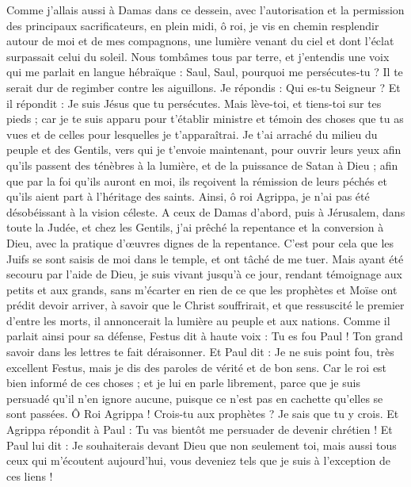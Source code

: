 \begin{multicols}{2}
Comme j'allais aussi à Damas dans ce dessein, avec l’autorisation et la permission des principaux sacrificateurs,
en plein midi, ô roi, je vis en chemin resplendir autour de moi et de mes compagnons, une lumière venant du ciel et dont l’éclat surpassait celui du soleil.
Nous tombâmes tous par terre, et j’entendis une voix qui me parlait en langue hébraïque : Saul, Saul, pourquoi me persécutes-tu ? Il te serait dur de regimber contre les aiguillons.
Je répondis : Qui es-tu Seigneur ? Et il répondit : Je suis Jésus que tu persécutes.
Mais lève-toi, et tiens-toi sur tes pieds ; car je te suis apparu pour t'établir ministre et témoin des choses que tu as vues et de celles pour lesquelles je t'apparaîtrai.
Je t’ai arraché du milieu du peuple et des Gentils, vers qui je t'envoie maintenant,
pour ouvrir leurs yeux afin qu'ils passent des ténèbres à la lumière, et de la puissance de Satan à Dieu ; afin que par la foi qu’ils auront en moi, ils reçoivent la rémission de leurs péchés et qu’ils aient part à l’héritage des saints.
Ainsi, ô roi Agrippa, je n’ai pas été désobéissant à la vision céleste.
A ceux de Damas d’abord, puis à Jérusalem, dans toute la Judée, et chez les Gentils, j’ai prêché la repentance et la conversion à Dieu, avec la pratique d’œuvres dignes de la repentance.
C'est pour cela que les Juifs se sont saisis de moi dans le temple, et ont tâché de me tuer.
Mais ayant été secouru par l'aide de Dieu, je suis vivant jusqu'à ce jour, rendant témoignage aux petits et aux grands, sans m’écarter en rien de ce que les prophètes et Moïse ont prédit devoir arriver,
à savoir que le Christ souffrirait, et que ressuscité le premier d’entre les morts, il annoncerait la lumière au peuple et aux nations.
Comme il parlait ainsi pour sa défense, Festus dit à haute voix : Tu es fou Paul ! Ton grand savoir dans les lettres te fait déraisonner.
Et Paul dit : Je ne suis point fou, très excellent Festus, mais je dis des paroles de vérité et de bon sens.
Car le roi est bien informé de ces choses ; et je lui en parle librement, parce que je suis persuadé qu'il n’en ignore aucune, puisque ce n’est pas en cachette qu’elles se sont passées.
Ô Roi Agrippa ! Crois-tu aux prophètes ? Je sais que tu y crois.
Et Agrippa répondit à Paul : Tu vas bientôt me persuader de devenir chrétien !
Et Paul lui dit : Je souhaiterais devant Dieu que non seulement toi, mais aussi tous ceux qui m'écoutent aujourd'hui, vous deveniez tels que je suis à l’exception de ces liens !

\end{multicols}
